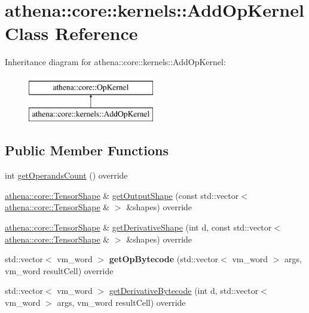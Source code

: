 \hypertarget{classathena_1_1core_1_1kernels_1_1_add_op_kernel}{}\section{athena\+:\+:core\+:\+:kernels\+:\+:Add\+Op\+Kernel Class Reference}
\label{classathena_1_1core_1_1kernels_1_1_add_op_kernel}
Inheritance diagram for athena\+:\+:core\+:\+:kernels\+:\+:Add\+Op\+Kernel\+:\begin{figure}[H]
\begin{center}
\leavevmode
\includegraphics[height=2.000000cm]{classathena_1_1core_1_1kernels_1_1_add_op_kernel}
\end{center}
\end{figure}
\subsection*{Public Member Functions}
\begin{DoxyCompactItemize}
\item 
int \mbox{\hyperlink{classathena_1_1core_1_1kernels_1_1_add_op_kernel_a296a0c69a7b906037324cce2b64827e1}{get\+Operands\+Count}} () override
\item 
\mbox{\hyperlink{classathena_1_1core_1_1_tensor_shape}{athena\+::core\+::\+Tensor\+Shape}} \& \mbox{\hyperlink{classathena_1_1core_1_1kernels_1_1_add_op_kernel_aaf21b2b72c6e601964e53eb6de7fccfd}{get\+Output\+Shape}} (const std\+::vector$<$ \mbox{\hyperlink{classathena_1_1core_1_1_tensor_shape}{athena\+::core\+::\+Tensor\+Shape}} \& $>$ \&shapes) override
\item 
\mbox{\hyperlink{classathena_1_1core_1_1_tensor_shape}{athena\+::core\+::\+Tensor\+Shape}} \& \mbox{\hyperlink{classathena_1_1core_1_1kernels_1_1_add_op_kernel_a873ce3dc366c72f651331d91dd48be0a}{get\+Derivative\+Shape}} (int d, const std\+::vector$<$ \mbox{\hyperlink{classathena_1_1core_1_1_tensor_shape}{athena\+::core\+::\+Tensor\+Shape}} \& $>$ \&shapes) override
\item 
\mbox{\label{classathena_1_1core_1_1kernels_1_1_add_op_kernel_a6aa2ce3c6d4c2b2eeaf99a83189e1f70}} 
std\+::vector$<$ vm\+\_\+word $>$ {\bfseries get\+Op\+Bytecode} (std\+::vector$<$ vm\+\_\+word $>$ args, vm\+\_\+word result\+Cell) override
\item 
std\+::vector$<$ vm\+\_\+word $>$ \mbox{\hyperlink{classathena_1_1core_1_1kernels_1_1_add_op_kernel_a97ac0c3c61c772563221c3148d553841}{get\+Derivative\+Bytecode}} (int d, std\+::vector$<$ vm\+\_\+word $>$ args, vm\+\_\+word result\+Cell) override
\end{DoxyCompactItemize}

